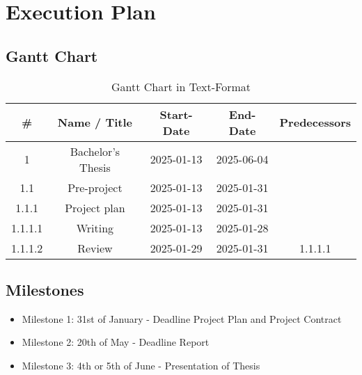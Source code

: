 \section{Execution Plan}
\subsection{Gantt Chart}
\begin{comment}
    1. Terraform for OpenStack
    2. Docker
    3. Evt. Database

    https://app.teamgantt.com/projects/gantt?ids=4177546
\end{comment}

\begin{table}[H]
    \centering
    \begin{tabular}{|c|c|c|c|c|}
    \hline
    \# & Name / Title & Start-Date & End-Date & Predecessors \\
    \hline
    1 & Bachelor's Thesis & 2025-01-13 & 2025-06-04 & \\
    \hline
    1.1 & Pre-project & 2025-01-13 & 2025-01-31 & \\
    \hline
    1.1.1 & Project plan & 2025-01-13 & 2025-01-31 & \\
    \hline
    1.1.1.1 & Writing & 2025-01-13 & 2025-01-28 & \\
    \hline
    1.1.1.2 & Review & 2025-01-29 & 2025-01-31 & 1.1.1.1 \\
    \hline
    \end{tabular}
    \caption{Gantt Chart in Text-Format}
    \label{tab:gantt_text}
\end{table}


\subsection{Milestones}
\begin{itemize}
    \item Milestone 1: 31st of January - Deadline Project Plan and Project Contract
    \item Milestone 2: 20th of May - Deadline Report
    \item Milestone 3: 4th or 5th of June - Presentation of Thesis
\end{itemize}

\begin{comment}
    kanskje ha en egen deadline/goal om MVP etter et par sprints
    kan gjøre user testing med en MVP
    ish midten av mars
\end{comment}